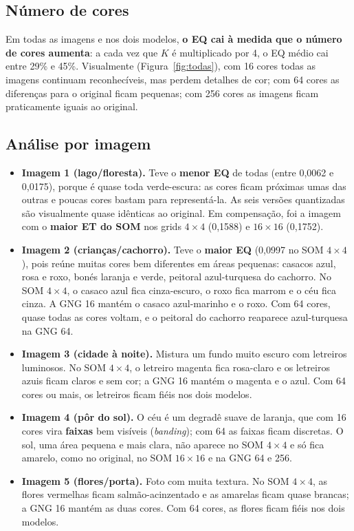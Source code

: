 \documentclass[11pt,a4paper]{article}
\begin{document}
\subsection{Número de cores}

Em todas as imagens e nos dois modelos, \textbf{o EQ cai à medida que o número de cores aumenta}: a cada vez que $K$ é multiplicado por 4, o EQ médio cai entre 29\% e 45\%. Visualmente (Figura~\ref{fig:todas}), com 16 cores todas as imagens continuam reconhecíveis, mas perdem detalhes de cor; com 64 cores as diferenças para o original ficam pequenas; com 256 cores as imagens ficam praticamente iguais ao original.

\subsection{Análise por imagem}

\begin{itemize}
    \item \textbf{Imagem 1 (lago/floresta).} Teve o \textbf{menor EQ} de todas (entre 0,0062 e 0,0175), porque é quase toda verde-escura: as cores ficam próximas umas das outras e poucas cores bastam para representá-la. As seis versões quantizadas são visualmente quase idênticas ao original. Em compensação, foi a imagem com o \textbf{maior ET do SOM} nos grids $4\times4$ (0,1588) e $16\times16$ (0,1752).
    \item \textbf{Imagem 2 (crianças/cachorro).} Teve o \textbf{maior EQ} (0,0997 no SOM $4\times4$), pois reúne muitas cores bem diferentes em áreas pequenas: casacos azul, rosa e roxo, bonés laranja e verde, peitoral azul-turquesa do cachorro. No SOM $4\times4$, o casaco azul fica cinza-escuro, o roxo fica marrom e o céu fica cinza. A GNG 16 mantém o casaco azul-marinho e o roxo. Com 64 cores, quase todas as cores voltam, e o peitoral do cachorro reaparece azul-turquesa na GNG 64.
    \item \textbf{Imagem 3 (cidade à noite).} Mistura um fundo muito escuro com letreiros luminosos. No SOM $4\times4$, o letreiro magenta fica rosa-claro e os letreiros azuis ficam claros e sem cor; a GNG 16 mantém o magenta e o azul. Com 64 cores ou mais, os letreiros ficam fiéis nos dois modelos.
    \item \textbf{Imagem 4 (pôr do sol).} O céu é um degradê suave de laranja, que com 16 cores vira \textbf{faixas} bem visíveis (\textit{banding}); com 64 as faixas ficam discretas. O sol, uma área pequena e mais clara, não aparece no SOM $4\times4$ e só fica amarelo, como no original, no SOM $16\times16$ e na GNG 64 e 256.
    \item \textbf{Imagem 5 (flores/porta).} Foto com muita textura. No SOM $4\times4$, as flores vermelhas ficam salmão-acinzentado e as amarelas ficam quase brancas; a GNG 16 mantém as duas cores. Com 64 cores, as flores ficam fiéis nos dois modelos.
\end{itemize}
\end{document}
